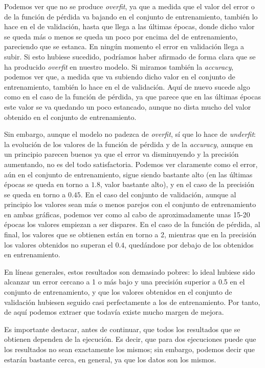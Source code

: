 \documentclass[11pt,a4paper]{article}
\begin{document}
Podemos ver que no se produce \textit{overfit}, ya que a medida que el valor del error o de la función de pérdida va
bajando en el conjunto de entrenamiento, también lo hace en el de validación, hasta que llega a las últimas épocas, donde dicho
valor se queda más o menos se queda un poco por encima del de entrenamiento, pareciendo que se estanca.
En ningún momento el error en validación llega a subir. Si esto hubiese sucedido, podríamos haber afirmado de forma clara
que se ha producido \textit{overfit} en nuestro modelo. Si miramos también la \textit{accuracy}, podemos ver que, a medida
que va subiendo dicho valor en el conjunto de entrenamiento, también lo hace en el de validación.
Aquí de nuevo sucede algo como en el caso de la función de pérdida, ya que parece que en las últimas épocas este valor se va
quedando un poco estancado, aunque no dista mucho del valor obtenido en el conjunto de entrenamiento.

Sin embargo, aunque el modelo no padezca de \textit{overfit}, sí que lo hace de \textit{underfit}: la evolución de los valores
de la función de pérdida y de la \textit{accuracy}, aunque en un principio parecen buenos ya que el error va disminuyendo y la
precisión aumentando, no es del todo satisfactoria. Podemos ver claramente como el error, aún en el conjunto de entrenamiento,
sigue siendo bastante alto (en las últimas épocas se queda en torno a $1.8$, valor bastante alto), y en el caso de la
precisión se queda en torno a $0.45$. En el caso del conjunto de validación, aunque al principio los valores sean más o
menos parejos con el conjunto de entrenamiento en ambas gráficas, podemos ver como al cabo de aproximadamente unas 15-20 épocas
los valores empiezan a ser dispares. En el caso de la función de pérdida, al final, los valores que se obtienen están en torno a 2,
mientras que en la precisión los valores obtenidos no superan el $0.4$, quedándose por debajo de los obtenidos en entrenamiento.

En líneas generales, estos resultados son demasiado pobres: lo ideal hubiese sido alcanzar un error cercano a 1 o
más bajo y una precisión superior a 0.5 en el conjunto de entrenamiento, y que los valores obtenidos en el conjunto de
validación hubiesen seguido casi perfectamente a los de entrenamiento. Por tanto, de aquí podemos extraer que todavía
existe mucho margen de mejora.

Es importante destacar, antes de continuar, que todos los resultados que se obtienen dependen de la ejecución. Es decir,
que para dos ejecuciones puede que los resultados no sean exactamente los mismos; sin embargo, podemos decir que estarán
bastante cerca, en general, ya que los datos son los mismos.
\end{document}
